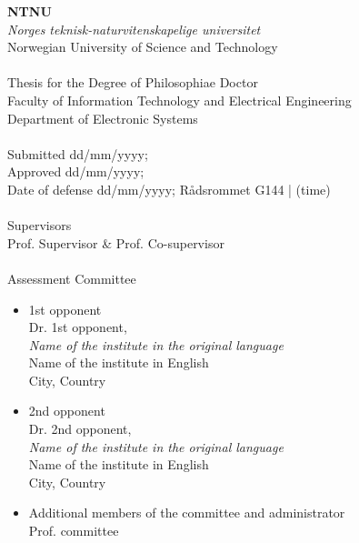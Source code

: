{
\fontsize{10}{11.4}\selectfont

\noindent \textbf{NTNU} \\
\textit{Norges teknisk-naturvitenskapelige universitet} \\
Norwegian University of Science and Technology \\
\\
Thesis for the Degree of Philosophiae Doctor \\
Faculty of Information Technology and Electrical Engineering \\
Department of Electronic Systems \\
\\
Submitted \hspace{8mm} dd/mm/yyyy; \\
Approved \hspace{8.8mm} dd/mm/yyyy; \\
Date of defense \hspace{1.0mm} dd/mm/yyyy; R{\aa}dsrommet G144 | (time) \\
\\
Supervisors \\
Prof. Supervisor \& Prof. Co-supervisor \\
\\
Assessment Committee
\vspace{-2.0mm}
\begin{itemize}[itemsep=0.7pt, parsep=0.7pt, leftmargin=3.5mm, label=]
\item 1st opponent \\
Dr. 1st opponent, \\ \textit{Name of the institute in the original language} \\ Name of the institute in English\\ City, Country
\item 2nd opponent \\
Dr. 2nd opponent, \\ \textit{Name of the institute in the original language} \\ Name of the institute in English\\ City, Country
\item Additional members of the committee and administrator \\
Prof. committee
\end{itemize}

\noindent\makebox[\linewidth]{\rule{\paperwidth}{0.4pt}} 

\vspace{3.0mm}

}
